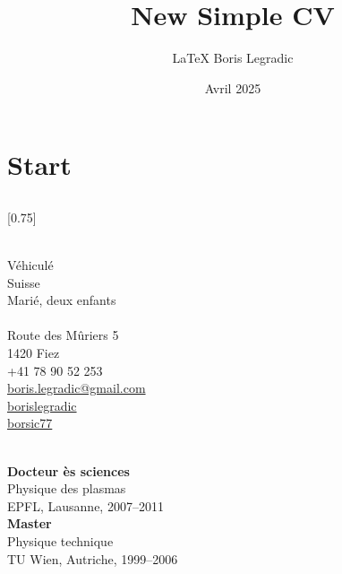 \documentclass[verylight]{simplehipstercv}
\title{New Simple CV}
\author{\LaTeX{} Boris Legradic}
\date{Avril 2025}
\begin{document}
\thispagestyle{empty}

\section*{Start}

\subsection*{}
\vspace{4em}

\setlength{\columnsep}{1.5cm}
[0.75]
\begin{paracol}{2}
\paracolbackgroundoptions

\footnotesize
{\setasidefontcolour
\flushright

\bigskip \bigskip
\begin{center}
\end{center}
\bigskip \bigskip

\\[0.5em]
Véhiculé\\
Suisse\\
Marié, deux enfants\\

\bigskip \bigskip
{}\\[0.5em]
Route des Mûriers 5\\
1420 Fiez\\
+41 78 90 52 253\\

\bigskip
\href{mailto:boris.legradic@gmail.com}{boris.legradic@gmail.com }\\
\href{https://www.linkedin.com/in/borislegradic}{borislegradic }\\
\href{https://github.com/borsic77}{borsic77 }

\bigskip \bigskip
{}\\[0.5em]
\textbf{Docteur ès sciences}\\
Physique des plasmas\\
EPFL, Lausanne, 2007–2011\\[0.5em]

\textbf{Master}\\
Physique technique\\
TU Wien, Autriche, 1999–2006

}
\end{paracol}
\end{document}
